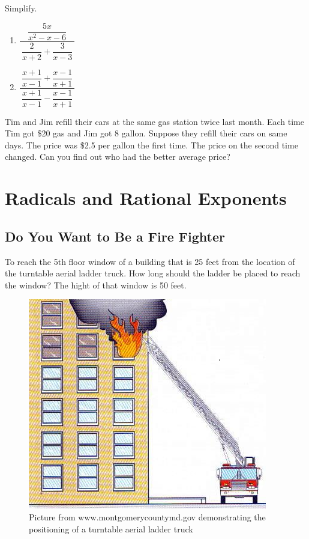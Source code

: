 \documentclass[en,12pt]{elegantbook}
\providecommand{\tightlist}{%
  \setlength{\itemsep}{0pt}\setlength{\parskip}{0pt}}
\let\BeginKnitrBlock\begin \let\EndKnitrBlock\end
\begin{document}
\BeginKnitrBlock{exercise}
\protect\hypertarget{exr:unnamed-chunk-78}{}{\label{exr:unnamed-chunk-78} }
Simplify.

\begin{enumerate}
\def\labelenumi{\arabic{enumi}.}
\tightlist
\item
  \(\dfrac{~\dfrac{5x}{x^2-x-6}~}{~\dfrac2{x+2}+\dfrac{3}{x-3}~}\)
\item
  \(\dfrac{~\dfrac{x+1}{x-1}+\dfrac{x-1}{x+1}~}{~\dfrac{x+1}{x-1}-\dfrac{x-1}{x+1}~}\)
\end{enumerate}
\EndKnitrBlock{exercise}

\BeginKnitrBlock{exercise}
\protect\hypertarget{exr:unnamed-chunk-79}{}{\label{exr:unnamed-chunk-79} }
Tim and Jim refill their cars at the same gas station twice last month. Each time Tim got \$20 gas and Jim got 8 gallon. Suppose they refill their cars on same days. The price was \$2.5 per gallon the first time. The price on the second time changed. Can you find out who had the better average price?
\EndKnitrBlock{exercise}

\hypertarget{radicals-and-rational-exponents}{%
\chapter{Radicals and Rational Exponents}\label{radicals-and-rational-exponents}}

\hypertarget{do-you-want-to-be-a-fire-fighter}{%
\section{Do You Want to Be a Fire Fighter}\label{do-you-want-to-be-a-fire-fighter}}

\BeginKnitrBlock{rmdthink}
To reach the 5th floor window of a building that is 25 feet from the location of the turntable aerial ladder truck. How long should the ladder be placed to reach the window? The hight of that window is 50 feet.

\begin{figure}
\centering
\includegraphics{figs/Aerial-Apparatus-Positioning.png}
\caption{Picture from www.montgomerycountymd.gov demonstrating the positioning of a turntable aerial ladder truck}
\end{figure}
\EndKnitrBlock{rmdthink}
\end{document}

